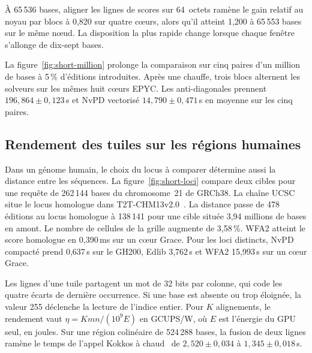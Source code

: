 À 65\,536 bases, aligner les lignes de scores sur 64~octets ramène le gain relatif au noyau par blocs à 0,820 sur quatre cœurs, alors qu’il atteint 1,200 à 65\,553 bases sur le même nœud. La disposition la plus rapide change lorsque chaque fenêtre s’allonge de dix-sept bases.

La figure~\ref{fig:short-million} prolonge la comparaison sur cinq paires d’un million de bases à 5\,\% d’éditions introduites. Après une chauffe, trois blocs alternent les solveurs sur les mêmes huit cœurs EPYC. Les anti-diagonales prennent \(196{,}864\pm0{,}123\)\,s et NvPD vectorisé \(14{,}790\pm0{,}471\)\,s en moyenne sur les cinq paires.


\subsection{Rendement des tuiles sur les régions humaines}
Dans un génome humain, le choix du locus à comparer détermine aussi la distance entre les séquences. La figure~\ref{fig:short-loci} compare deux cibles pour une requête de 262\,144 bases du chromosome~21 de GRCh38. La chaîne UCSC situe le locus homologue dans T2T-CHM13v2.0~\cite{grch38,t2t,ucscchain}. La distance passe de 478 éditions au locus homologue à 138\,141 pour une cible située 3,94 millions de bases en amont. Le nombre de cellules de la grille augmente de 3,58\,\%. WFA2 atteint le score homologue en 0,390\,ms sur un cœur Grace. Pour les loci distincts, NvPD compacté prend 0,637\,s sur le GH200, Edlib 3,762\,s et WFA2 15,993\,s sur un cœur Grace.

Les lignes d’une tuile partagent un mot de 32 bits par colonne, qui code les quatre écarts de dernière occurrence. Si une base est absente ou trop éloignée, la valeur 255 déclenche la lecture de l’indice entier. Pour \(K\) alignements, le rendement vaut \(\eta=Kmn/(10^9E)\) en GCUPS/W, où \(E\) est l’énergie du GPU seul, en joules. Sur une région colinéaire de 524\,288 bases, la fusion de deux lignes ramène le temps de l’appel Kokkos à chaud~\cite{kokkos,kokkoscode} de \(2{,}520\pm0{,}034\) à \(1{,}345\pm0{,}018\)\,s.

